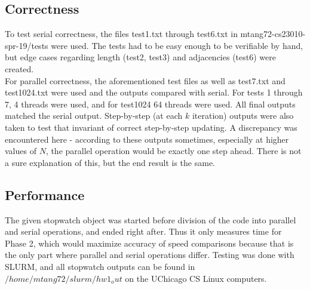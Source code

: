 \documentclass{article}
\begin{document}
\begin{adjustwidth}{-2cm}{-2cm}
\subsection{Correctness}
To test serial correctness, the files test1.txt through test6.txt in mtang72-cs23010-spr-19/tests were used. The tests had to be easy enough to be verifiable by hand, but edge cases regarding length (test2, test3) and adjacencies (test6) were created.\\
For parallel correctness, the aforementioned test files as well as test7.txt and test1024.txt were used and the outputs compared with serial. For tests 1 through 7, 4 threads were used, and for test1024 64 threads were used. All final outputs matched the serial output. Step-by-step (at each $k$ iteration) outputs were also taken to test that invariant of correct step-by-step updating. A discrepancy was encountered here - according to these outputs sometimes, especially at higher values of $N$, the parallel operation would be exactly one step ahead. There is not a sure explanation of this, but the end result is the same.
\subsection{Performance}
The given stopwatch object was started before division of the code into parallel and serial operations, and ended right after. Thus it only measures time for Phase 2, which would maximize accuracy of speed comparisons because that is the only part where parallel and serial operations differ. Testing was done with SLURM, and all stopwatch outputs can be found in $/home/mtang72/slurm/hw1_out$ on the UChicago CS Linux computers.

\end{adjustwidth}
\end{document}
